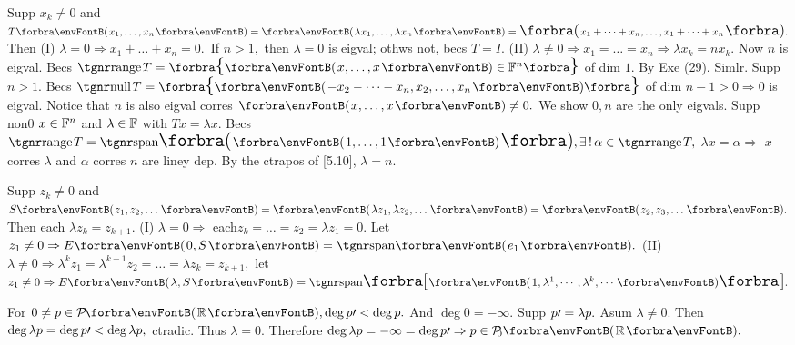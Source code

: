 Supp $x_k\neq 0$ and $T\Par{x_1,\dots,x_n}=\Par{\lambda x_1,\dots,\lambda x_n}=\BigPar{x_1+\dots+x_n,\dots,x_1+\dots+x_n}.$\parSol{}
Then (I) $\lambda=0\Rightarrow x_1+\dots+x_n=0.$ \,If $n>1,$ then $\lambda=0$ is eigval; othws not, becs $T=I.$\parSol{}
(II) $\lambda\neq 0\Rightarrow x_1=\dots=x_n\Rightarrow\lambda x_k=n x_k.$ Now $n$ is eigval.\PfEnd\vspace{2pt}\parSol{}
\Or Becs $\range T=\Bra{\Par{x,\dots,x}\in\Fbb^n}$ of dim $1.$ By Exe (29). Simlr.\PfEnd\parSol{}
\Or Supp $n>1.$ Becs $\null T=\Bra{\Par{{-x_2-\dots-x_n,x_2,\dots,x_n}}}$ of dim $n-1>0\Rightarrow 0$ is eigval.\parSol{}
Notice that $n$ is also eigval corres $\Par{x,\dots,x}\neq 0.$ We show $0,n$ are the only eigvals.\parSol{}
Supp non0 $x\in{\mathbb{F}}^n$ and $\lambda\in{\mathbb{F}}$ with $Tx=\lambda x.$ Becs $\range T=\Span[\BigPar]{\Par{1,\dots,1}},\exists\,!\,\alpha\in\range T,$\parSol{}
$\lambda x=\alpha\Rightarrow$ $x$ corres $\lambda$ and $\alpha$ corres $n$ are liney dep. By the ctrapos of [5.10], $\lambda=n.$\PfEnd
\SepLine

Supp $z_k\neq 0$ and $S\Par{z_1,z_2,\dots}=\Par{\lambda z_1,\lambda z_2,\dots}=\Par{z_2,z_3,\dots}.$ Then each $\lambda z_k=z_{k+1}.$\parSol{}
(I) $\lambda=0\Rightarrow$ each$z_k=\dots=z_2=\lambda z_1=0.$ Let $z_1\neq0\Rightarrow E\Par{0,S}=\Span{e_1}.$\parSol{}
(II) $\lambda\neq 0\Rightarrow\lambda^k z_1=\lambda^{k-1} z_2=\dots=\lambda z_k=z_{k+1},$ let $z_1\neq 0\Rightarrow E\Par{\lambda,S}=\Span[\Sbra]{\Par{1,\lambda^1,\cdots,\lambda^k,\cdots}}.$\PfEnd
\SepLine

For $0\neq p\in\PoRi,\deg p\apostrophe<\deg p.$ And $\deg 0=-\infty.$ Supp $p\prime=\lambda p.$\parSol{}
Asum $\lambda\neq 0.$ Then $\deg\lambda p=\deg p\prime<\deg\lambda p,$ ctradic. Thus $\lambda=0.$\parSol{}
Therefore $\deg\lambda p=-\infty=\deg p\apostrophe\Rightarrow p\in\PoR{0}.$\PfEnd
\SepLine


